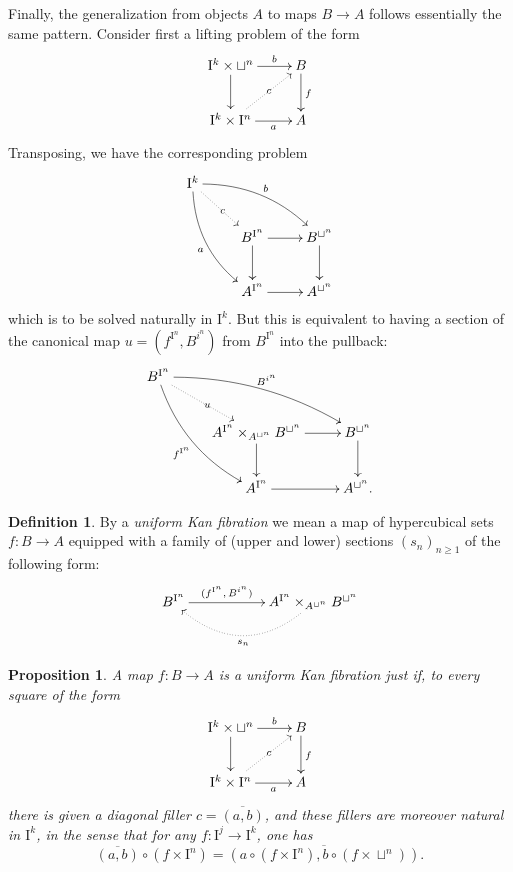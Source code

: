 \documentclass[11pt]{article}
\newcommand{\I}{\ensuremath{\mathrm{I}}}
\newtheorem{proposition}[theorem]{Proposition}
\theoremstyle{remark}
\theoremstyle{definition}
\newtheorem{definition}[theorem]{Definition}
\begin{document}
Finally, the generalization from objects $A$ to maps $B\to A$ follows essentially the same pattern. Consider first a lifting problem of the form
\begin{equation}\label{diagram:boxfillfib}
\xymatrix{
\I^k \times \sqcup^n \ar[d] \ar[r]^-{b} & B \ar[d]^{f} \\
\I^k \times \I^n \ar[r]_-{a} \ar@{.>}[ru]|-{c} & A
}
\end{equation}
Transposing, we have the corresponding problem
\begin{equation*}%
\xymatrix{
\I^k \ar@/{}_{1pc}/[rdd]_{a} \ar@/{}^{1pc}/[rrd]^{b} \ar@{.>}[rd]|{c} & & \\
& B^{\I^n} \ar[d] \ar[r] & B^{\sqcup^n } \ar[d] \\
& A^{\I^n} \ar[r] & A^{\sqcup^n }
}
\end{equation*}
which is to be solved naturally in $\I^k$.  But this is equivalent to having a section of the canonical map $u = (f^{\I^n}, B^{i^n})$ from $B^{\I^n}$ into the pullback:
\begin{equation}\label{diagram:pullbackforukf}
\xymatrix{
B^{\I^n} \ar@/{}_{1pc}/[rdd]_{f^{\I^n}} \ar@/{}^{1pc}/[rrd]^{B^{i^n}} \ar@{.>}[rd]|{u} & & \\
&  A^{\I^n} \times_{A^{\sqcup^n }} B^{\sqcup^n }  \ar[d] \ar[r] & B^{\sqcup^n } \ar[d] \\
& A^{\I^n} \ar[r] & A^{\sqcup^n }.
}
\end{equation}

\begin{definition}\label{def:Kanfib} By a \emph{uniform Kan fibration} we mean a map of hypercubical sets $f: B\to A$ equipped with a family of (upper and lower) sections $(s_n)_{n\geq 1}$ of the following form:
\[
\xymatrix{
B^{\I^n} \ar[rr]^-{(f^{\I^n},\, B^{i^n})} & & \ar@{.>}@/{}^{2pc}/[ll]^{s_n} A^{\I^n} \times_{A^{\sqcup^n }} B^{\sqcup^n }
}
\]
\end{definition}

\begin{proposition}
A map $f : B\to A$ is a uniform Kan fibration just if, to every square of the form
\begin{equation}%
\xymatrix{
\I^k \times \sqcup^n \ar[d] \ar[r]^-{b} & B \ar[d]^{f} \\
\I^k \times \I^n \ar[r]_-{a} \ar@{.>}[ru]|-{c} & A
}
\end{equation}
there is given a diagonal filler $c = \overline{(a,b)}$, and these fillers are moreover natural in $\I^k$, in the sense that for any $f : \I^j \to \I^k$, one has
\[
\overline{(a,b)}\circ(f\times \I^n) = \overline{(a\circ (f\times \I^n), b\circ (f\times \sqcup^n))}.
\]
\end{proposition}
\end{document}
